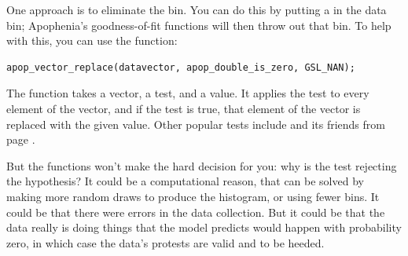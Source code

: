One approach is to eliminate the bin. You can do this by putting a
 in the data bin; Apophenia's goodness-of-fit functions will
then throw out that bin. To help with this, you can use the
 function:
\begin{lstlisting}
apop_vector_replace(datavector, apop_double_is_zero, GSL_NAN);
\end{lstlisting}
The function takes a vector, a test, and a  value. It
applies the test to every element of the vector, and if the test is
true, that element of the vector is replaced with the given value. Other
popular tests include  and its friends from page
\pageref{numbers}.

But the functions won't make the hard decision for you: why is the test
rejecting the hypothesis? It could be a computational reason, that can be solved by  making more random draws to produce the histogram, or using fewer bins.
It could be that there were errors in the  data collection.
But it could be that the data really is doing things that the model
predicts would happen with probability zero, in which case the data's
protests are valid and to be heeded.

